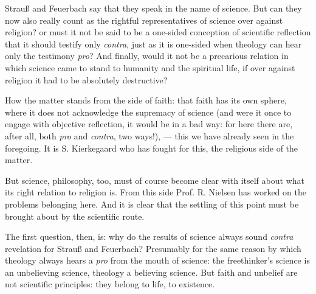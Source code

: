 \documentclass[12pt,a4paper]{book}
\newcommand{\opage}[1]{\marginnote{\footnotesize\textit{[#1]}}}
\begin{document}
Strauß and Feuerbach say that they speak in the name of science.
But can they now also really count as the rightful representatives
of science over against religion? or must it
not be said to be a one-sided conception of scientific
reflection that it should testify only \textit{contra}, just as it
\opage{38}\setcounter{footnote}{0}%
is one-sided when theology can hear only the testimony \textit{pro}?
And finally, would it not be a precarious relation in which
science came to stand to humanity and the spiritual
life, if over against religion it had to be absolutely destructive?

How the matter stands from the side of faith: that faith
has its own sphere, where it does not acknowledge the supremacy of science
(and were it once to engage with objective reflection,
it would be in a bad way: for here there are, after all, both \textit{pro} and
\textit{contra}, two ways!), --- this we have already seen in the
foregoing. It is S. Kierkegaard who has fought for this,
the religious side of the matter.

But science, philosophy, too, must of course become clear with
itself about what its right relation to religion is. From
this side Prof. R. Nielsen has worked on the problems
belonging here. And it is clear that the settling of this point
must be brought about by the scientific route.

The first question, then, is: why do the results of science
always sound \textit{contra} revelation for Strauß and Feuerbach?
Presumably for the same reason by which theology always hears
a \textit{pro} from the mouth of science: the freethinker's science is an
unbelieving science, theology a believing science. But faith
and unbelief are not scientific principles: they belong to life,
to existence.
\end{document}
